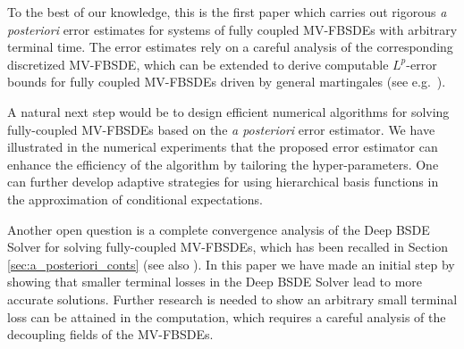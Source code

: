 \documentclass[11pt]{article}
\numberwithin{equation}{section}
\theoremstyle{definition}
\theoremstyle{remark}
\begin{document}
To the best of our knowledge, this is the first paper which carries out rigorous  
\textit{a posteriori} error estimates for 
systems of
fully coupled MV-FBSDEs with arbitrary terminal time.
The error estimates rely on a careful analysis of the corresponding discretized MV-FBSDE,
 which can be extended to derive 
  computable $L^p$-error bounds 
 for  fully coupled MV-FBSDEs driven by general martingales (see e.g.~\cite{el1997}).

A natural next step would be to design efficient numerical algorithms for solving fully-coupled MV-FBSDEs 
based on the \textit{a posteriori} error estimator. 
We have illustrated in the  numerical experiments 
that the proposed error estimator can enhance the efficiency of the algorithm by tailoring the hyper-parameters.
One can further develop adaptive strategies for using hierarchical basis functions in the approximation of  conditional expectations.

Another open question is a complete convergence analysis of 
the Deep BSDE Solver for solving fully-coupled MV-FBSDEs,
which has been recalled in Section \ref{sec:a_posteriori_conts}  (see also \cite{germain2019}).
In this paper we have made an initial step 
by showing that smaller terminal losses in the Deep BSDE Solver lead to more accurate solutions.
Further  research is needed to show an arbitrary small terminal loss can be attained in the computation,
which requires a careful analysis of the decoupling fields of the MV-FBSDEs.
\end{document}
